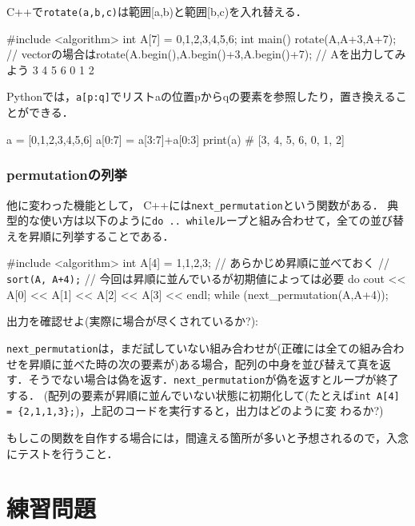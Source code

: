 C++で\texttt{rotate(a,b,c)}は範囲[a,b)と範囲[b,c)を入れ替える．
\begin{cbox}
#include <algorithm>
int A[7] = {0,1,2,3,4,5,6};
int main() {
  rotate(A,A+3,A+7);
  // vectorの場合はrotate(A.begin(),A.begin()+3,A.begin()+7);
  // Aを出力してみよう \dingright{} 3 4 5 6 0 1 2
}
\end{cbox}

Pythonでは，\texttt{a[p:q]}でリストaの位置pからqの要素を参照したり，置き換えることができる．
\begin{pybox}
a = [0,1,2,3,4,5,6]
a[0:7] = a[3:7]+a[0:3]
print(a) # \dingright{} [3, 4, 5, 6, 0, 1, 2]
\end{pybox}

\subsubsection{permutationの列挙}

他に変わった機能として，
C++には\texttt{next\_permutation}という関数がある．
典型的な使い方は以下のように\texttt{do .. while}ループと組み合わせて，全ての並び替えを昇順に列挙することである．

\begin{cbox}
#include <algorithm>
    int A[4] = {1,1,2,3}; // あらかじめ昇順に並べておく
    // \texttt{sort(A, A+4);} // 今回は昇順に並んでいるが初期値によっては必要
    do {
        cout << A[0] << A[1] << A[2] << A[3] << endl;
    } while (next_permutation(A,A+4));
\end{cbox}

出力を確認せよ(実際に場合が尽くされているか?):


\texttt{next\_permutation}は，まだ試していない組み合わせが(正確には全ての組み合わせを昇順に並べた時の次の要素が)ある場合，配列の中身を並び替えて真を返す．そうでない場合は偽を返す．\texttt{next\_permutation}が偽を返すとループが終了する．
(配列の要素が昇順に並んでいない状態に初期化して(たとえば\texttt{int
  A[4] = \{2,1,1,3\};})，上記のコードを実行すると，出力はどのように変
わるか?)

もしこの関数を自作する場合には，間違える箇所が多いと予想されるので，入念にテストを行うこと．

\section{練習問題}

